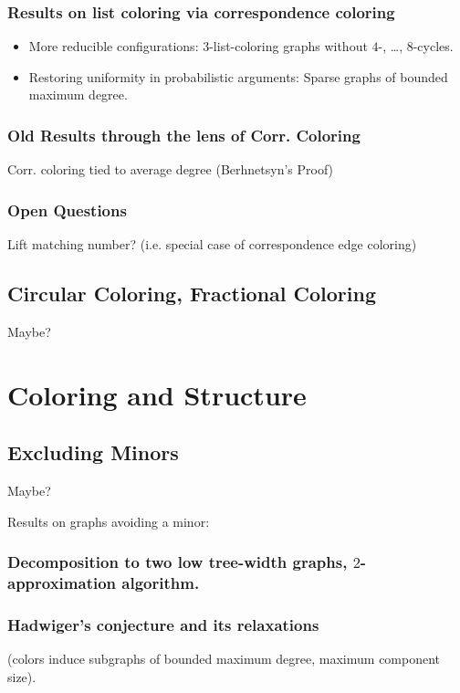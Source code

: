 \documentclass[12pt,twoside,openright,a4paper]{book}
\begin{document}
\section{Results on list coloring via correspondence coloring}

\begin{itemize}
\item More reducible configurations: $3$-list-coloring graphs without $4$-, \ldots, $8$-cycles.
\item Restoring uniformity in probabilistic arguments: Sparse graphs of bounded maximum degree.
\end{itemize}

\section{Old Results through the lens of Corr. Coloring}

Corr. coloring tied to average degree (Berhnetsyn's Proof)

\section{Open Questions}

Lift matching number? (i.e. special case of correspondence edge coloring)

\chapter{Circular Coloring, Fractional Coloring}

Maybe?

\part{Coloring and Structure}

\chapter{Excluding Minors}

Maybe?

Results on graphs avoiding a minor:


\section{Decomposition to two low tree-width graphs, $2$-approximation algorithm.}
\section{Hadwiger's conjecture and its relaxations}
(colors induce subgraphs of bounded maximum degree, maximum component size).
\end{document}
